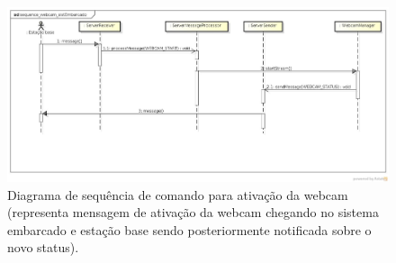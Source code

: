 \begin{figure}[H]
  \centering
  \includegraphics[width=\textwidth, keepaspectratio]{./figuras/sistEmbarcado/sequence_webcam_sistEmbarcado.jpg}
  \caption{Diagrama de sequência de comando para ativação da webcam (representa mensagem de ativação da webcam chegando no sistema embarcado e estação base sendo posteriormente notificada sobre o novo status).}
  \label{fig:diagrama_sequencia_webcam_sist_embarcado}
\end{figure}


